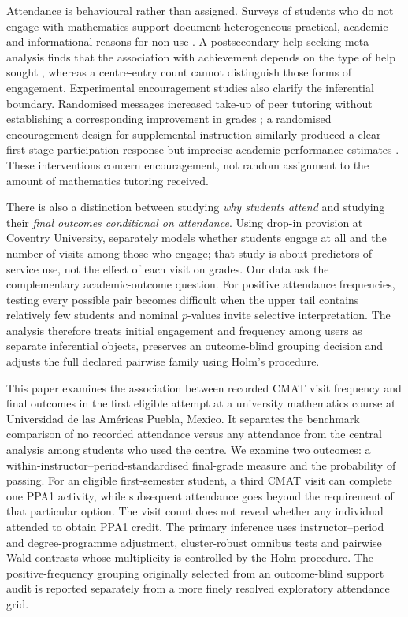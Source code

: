 \documentclass[namedate,webpdf,imaiai]{ima-authoring-template}
\begin{document}
Attendance is behavioural rather than assigned. Surveys of students who do not engage with mathematics support document heterogeneous practical, academic and informational reasons for non-use \citep{macanbhaird2013}. A postsecondary help-seeking meta-analysis finds that the association with achievement depends on the type of help sought \citep{fong2023}, whereas a centre-entry count cannot distinguish those forms of engagement. Experimental encouragement studies also clarify the inferential boundary. Randomised messages increased take-up of peer tutoring without establishing a corresponding improvement in grades \citep{pugatch2018}; a randomised encouragement design for supplemental instruction similarly produced a clear first-stage participation response but imprecise academic-performance estimates \citep{paloyo2016}. These interventions concern encouragement, not random assignment to the amount of mathematics tutoring received.

There is also a distinction between studying \emph{why students attend} and studying their \emph{final outcomes conditional on attendance}. Using drop-in provision at Coventry University, \citet{gokhool2026} separately models whether students engage at all and the number of visits among those who engage; that study is about predictors of service use, not the effect of each visit on grades. Our data ask the complementary academic-outcome question. For positive attendance frequencies, testing every possible pair becomes difficult when the upper tail contains relatively few students and nominal $p$-values invite selective interpretation. The analysis therefore treats initial engagement and frequency among users as separate inferential objects, preserves an outcome-blind grouping decision and adjusts the full declared pairwise family using Holm's procedure.

This paper examines the association between recorded CMAT visit frequency and final outcomes in the first eligible attempt at a university mathematics course at Universidad de las Am\'ericas Puebla, Mexico. It separates the benchmark comparison of no recorded attendance versus any attendance from the central analysis among students who used the centre. We examine two outcomes: a within-instructor--period-standardised final-grade measure and the probability of passing. For an eligible first-semester student, a third CMAT visit can complete one PPA1 activity, while subsequent attendance goes beyond the requirement of that particular option. The visit count does not reveal whether any individual attended to obtain PPA1 credit. The primary inference uses instructor--period and degree-programme adjustment, cluster-robust omnibus tests and pairwise Wald contrasts whose multiplicity is controlled by the Holm procedure. The positive-frequency grouping originally selected from an outcome-blind support audit is reported separately from a more finely resolved exploratory attendance grid.
\end{document}
